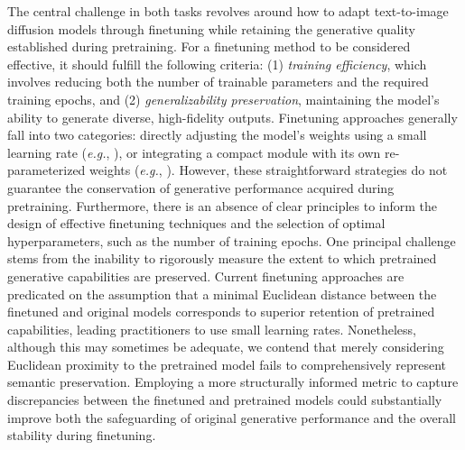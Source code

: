 The central challenge in both tasks revolves around how to adapt text-to-image diffusion models through finetuning while retaining the generative quality established during pretraining. For a finetuning method to be considered effective, it should fulfill the following criteria: (1) \emph{training efficiency}, which involves reducing both the number of trainable parameters and the required training epochs, and (2) \emph{generalizability preservation}, maintaining the model's ability to generate diverse, high-fidelity outputs. Finetuning approaches generally fall into two categories: directly adjusting the model’s weights using a small learning rate (\emph{e.g.}, \cite{ruiz2023dreambooth}), or integrating a compact module with its own re-parameterized weights (\emph{e.g.}, \cite{hulora2022,zhang2023adding}). However, these straightforward strategies do not guarantee the conservation of generative performance acquired during pretraining. Furthermore, there is an absence of clear principles to inform the design of effective finetuning techniques and the selection of optimal hyperparameters, such as the number of training epochs. One principal challenge stems from the inability to rigorously measure the extent to which pretrained generative capabilities are preserved. Current finetuning approaches are predicated on the assumption that a minimal Euclidean distance between the finetuned and original models corresponds to superior retention of pretrained capabilities, leading practitioners to use small learning rates. Nonetheless, although this may sometimes be adequate, we contend that merely considering Euclidean proximity to the pretrained model fails to comprehensively represent semantic preservation. Employing a more structurally informed metric to capture discrepancies between the finetuned and pretrained models could substantially improve both the safeguarding of original generative performance and the overall stability during finetuning.

